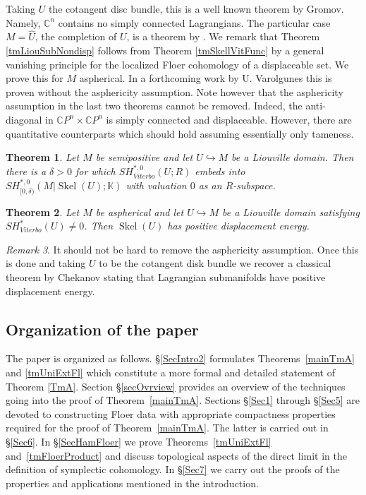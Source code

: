 \documentclass[11pt]{amsart}
\newcommand{\C}{\mathbb{C}}
\newcommand{\K}{\mathbb{K}}
\DeclareMathOperator{\Skel}{Skel}
\newtheorem{tm}{Theorem}[section]
\theoremstyle{definition}
\theoremstyle{remark}
\newtheorem{rem}[tm]{Remark}
\begin{document}
Taking $U$ the cotangent disc bundle, this is a well known theorem by Gromov. Namely, $\C^n$ contains no simply connected Lagrangians. The particular case $M=\hat{U}$, the completion of $U$, is a theorem by \cite{kang2014}. We remark that Theorem \ref{tmLiouSubNondisp} follows from Theorem \ref{tmSkellVitFunc} by a general vanishing principle for the localized Floer cohomology of a displaceable set. We prove this for $M$ aspherical. In a forthcoming work by U. Varolgunes this is proven without the asphericity assumption. Note however that the asphericity assumption in the last two theorems cannot be removed. Indeed, the anti-diagonal in $\C P^n\times\C P^n$ is simply connected and displaceable. However, there are quantitative counterparts which should hold assuming essentially only tameness.
\begin{tm}\label{tmEpsLiouEmb}
Let $M$ be semipositive and let $U\hookrightarrow M$ be a Liouville domain. Then there is a $\delta>0$ for which $SH^{*,0}_{Viterbo}(U;R)$ embeds into $SH^{*,0}_{[0,\delta)}(M|\Skel(U);\K)$ with valuation $0$ as an $R$-subspace.
\end{tm}

\begin{tm}\label{tmPosDis}
Let $M$ be aspherical and let $U\hookrightarrow M$ be a Liouville domain satisfying $SH^*_{Viterbo}(U)\neq 0$. Then $\Skel(U)$ has positive displacement energy.
\end{tm}

\begin{rem}
It should not be hard to remove the asphericity assumption. Once this is done and taking $U$ to be the cotangent disk bundle we recover a classical theorem by Chekanov \cite{Chekanov1998} stating that Lagrangian submanifolds have positive displacement energy.
\end{rem}

\subsection{Organization of the paper}
The paper is organized as follows. \S\ref{SecIntro2} formulates Theorems~\ref{mainTmA} and \ref{tmUniExtFl} which constitute a more formal and detailed statement of Theorem \ref{TmA}. Section \S\ref{secOvrview} provides an overview of the techniques going into the proof of Theorem~\ref{mainTmA}. Sections \S\ref{Sec1} through \S\ref{Sec5} are devoted to constructing Floer data with appropriate compactness properties required for the proof of Theorem~\ref{mainTmA}. The latter is carried out in \S\ref{Sec6}. In \S\ref{SecHamFloer} we prove Theorems~\ref{tmUniExtFl} and~\ref{tmFloerProduct} and discuss topological aspects of the direct limit in the definition of symplectic cohomology. In \S\ref{Sec7} we carry out the proofs of the properties and applications mentioned in the introduction.
\end{document}
